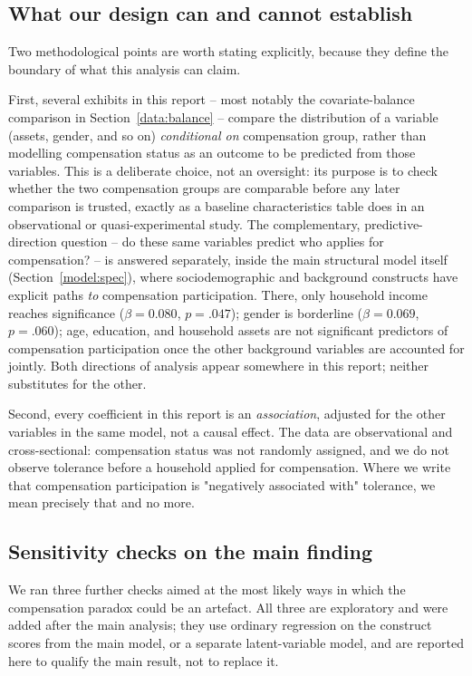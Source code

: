\subsection{What our design can and cannot establish}
\label{discussion:design}

Two methodological points are worth stating explicitly, because they define
the boundary of what this analysis can claim.

First, several exhibits in this report -- most notably the covariate-balance
comparison in Section~\ref{data:balance} -- compare the distribution of a
variable (assets, gender, and so on) \emph{conditional on} compensation
group, rather than modelling compensation status as an outcome to be
predicted from those variables. This is a deliberate choice, not an
oversight: its purpose is to check whether the two compensation groups are
comparable before any later comparison is trusted, exactly as a baseline
characteristics table does in an observational or quasi-experimental study.
The complementary, predictive-direction question -- do these same variables
predict who applies for compensation? -- is answered separately, inside the
main structural model itself (Section~\ref{model:spec}), where
sociodemographic and background constructs have explicit paths \emph{to}
compensation participation. There, only household income reaches
significance ($\beta = 0.080$, $p = .047$); gender is borderline
($\beta = 0.069$, $p = .060$); age, education, and household assets are not
significant predictors of compensation participation once the other
background variables are accounted for jointly. Both directions of analysis
appear somewhere in this report; neither substitutes for the other.

Second, every coefficient in this report is an \emph{association}, adjusted
for the other variables in the same model, not a causal effect. The data are
observational and cross-sectional: compensation status was not randomly
assigned, and we do not observe tolerance before a household applied for
compensation. Where we write that compensation participation is "negatively
associated with" tolerance, we mean precisely that and no more.

\subsection{Sensitivity checks on the main finding}
\label{discussion:sensitivity}

We ran three further checks aimed at the most likely ways in which the
compensation paradox could be an artefact. All three are exploratory and
were added after the main analysis; they use ordinary regression on the
construct scores from the main model, or a separate latent-variable model,
and are reported here to qualify the main result, not to replace it.

